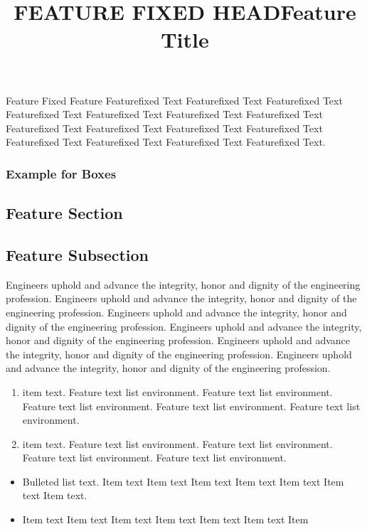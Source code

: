 \begin{featureFixed}[]

\title{FEATURE FIXED HEAD}Feature Fixed Feature Featurefixed Text Featurefixed Text Featurefixed Text
Featurefixed Text Featurefixed Text Featurefixed Text Featurefixed Text 
Featurefixed Text Featurefixed Text Featurefixed Text Featurefixed Text 
Featurefixed Text Featurefixed Text Featurefixed Text Featurefixed Text.
\end{featureFixed}

\subsubsection*{Example for Boxes}

\begin{feature}[Box]

\title{Feature Title}

\section{Feature Section}

\subsection{Feature Subsection}

Engineers uphold and advance the integrity, honor and dignity of the engineering profession. Engineers uphold and advance the integrity, honor and dignity of the engineering profession. Engineers uphold and advance the integrity, honor and dignity of the engineering profession. Engineers uphold and advance the integrity, honor and dignity of the engineering profession. Engineers uphold and advance the integrity, honor and dignity of the engineering profession. Engineers uphold and advance the integrity, honor and dignity of the engineering profession.

\begin{enumerate}[1.]
\item item text. Feature text list environment. Feature text list environment. Feature text list environment. Feature text list environment. Feature text list environment.
\item item text. Feature text list environment. Feature text list environment. Feature text list environment. Feature text list environment.
\end{enumerate}

\begin{itemize}
\item Bulleted list text. Item text  Item text  Item text  Item text  Item text
Item text  Item text.
\item Item text  Item text  Item text  Item text  Item text  Item text  Item 
\end{itemize}


\end{feature}
